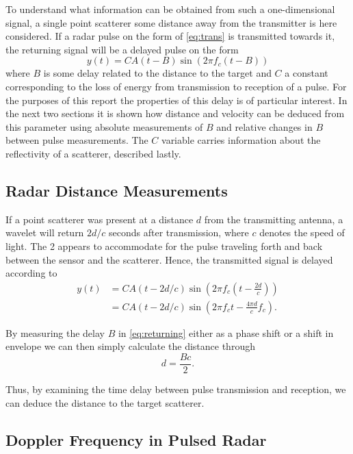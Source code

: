 To understand what information can be obtained from such a one-dimensional signal, a single point scatterer some distance away from the transmitter is here considered. If a radar pulse on the form of \eqref{eq:trans} is transmitted towards it, the returning signal will be a delayed pulse on the form \citep{richards_2014}
\begin{equation}\label{eq:returning}
	y(t) = CA(t-B)\sin(2\pi f_c (t-B))
\end{equation}
where $B$ is some delay related to the distance to the target and $C$ a constant corresponding to the loss of energy from transmission to reception of a pulse. For the purposes of this report the properties of this delay is of particular interest. In the next two sections it is shown how distance and velocity can be deduced from this parameter using absolute measurements of $B$ and relative changes in $B$ between pulse measurements. The $C$ variable carries information about the reflectivity of a scatterer, described lastly. 

\subsection{Radar Distance Measurements}

If a point scatterer was present at a distance $d$ from the transmitting antenna, a wavelet will return $2d/c$ seconds after transmission, where $c$ denotes the speed of light. The 2 appears to accommodate for the pulse traveling forth and back between the sensor and the scatterer. Hence, the transmitted signal is delayed according to 
\begin{equation}
	\begin{split}
		y(t) 
		& = CA(t-2d/c)\sin(2\pi f_c(t - \frac{2d}{c})) \\
		& = CA(t-2d/c)\sin(2\pi f_ct - \frac{4\pi d}{c}f_c).
	\end{split}
\end{equation}

By measuring the delay $B$ in \eqref{eq:returning} either as a phase shift or a shift in envelope we can then simply calculate the distance through
\begin{equation}
	d = \frac{Bc}{2}.
\end{equation}

Thus, by examining the time delay between pulse transmission and reception, we can deduce the distance to the target scatterer. 

\subsection{Doppler Frequency in Pulsed Radar}\label{sec:doppler}
\label{doppler}

